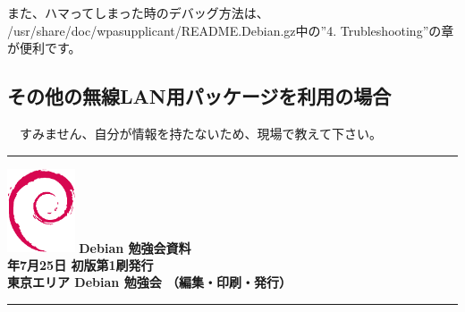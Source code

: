 \documentclass[mingoth,a4paper]{jsarticle}
\newcommand{\debmtgyear}{2015}
\newcommand{\debmtgmonth}{7}
\newcommand{\debmtgdate}{25}
\begin{document}
 また、ハマってしまった時のデバッグ方法は、
/usr/share/doc/wpasupplicant/README.Debian.gz中の''4. Trubleshooting''の章が便利です。

 \subsection{その他の無線LAN用パッケージを利用の場合}

　すみません、自分が情報を持たないため、現場で教えて下さい。

\cleartooddpage

\vspace*{15cm}
\hrule
\vspace{2mm}
\includegraphics[width=2cm]{image200502/openlogo-nd.eps}
\noindent \Large \bf Debian 勉強会資料\\
\noindent \normalfont \debmtgyear{}年\debmtgmonth{}月\debmtgdate{}日 \hspace{5mm}  初版第1刷発行\\
\noindent \normalfont 東京エリア Debian 勉強会 （編集・印刷・発行）\\
\hrule
\end{document}
